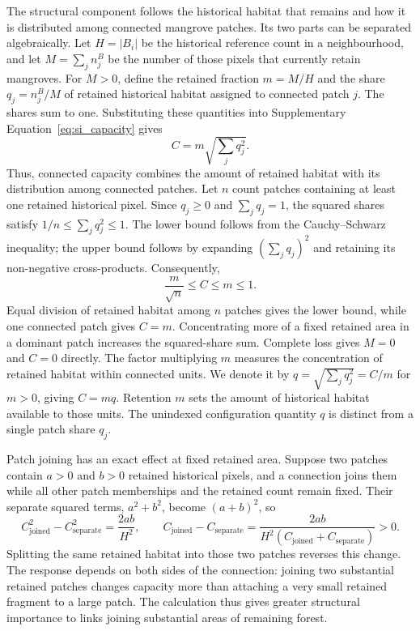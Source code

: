 The structural component follows the historical habitat that remains and how it is distributed among connected mangrove patches. Its two parts can be separated algebraically. Let $H=|B_i|$ be the historical reference count in a neighbourhood, and let $M=\sum_j n_j^B$ be the number of those pixels that currently retain mangroves. For $M>0$, define the retained fraction $m=M/H$ and the share $q_j=n_j^B/M$ of retained historical habitat assigned to connected patch $j$. The shares sum to one. Substituting these quantities into Supplementary Equation~\eqref{eq:si_capacity} gives
\begin{equation}\label{eq:si_capacity_factor}
C=m\sqrt{\sum_j q_j^2}.
\end{equation}
Thus, connected capacity combines the amount of retained habitat with its distribution among connected patches. Let $n$ count patches containing at least one retained historical pixel. Since $q_j\geq0$ and $\sum_jq_j=1$, the squared shares satisfy $1/n\leq\sum_jq_j^2\leq1$. The lower bound follows from the Cauchy--Schwarz inequality; the upper bound follows by expanding $(\sum_jq_j)^2$ and retaining its non-negative cross-products. Consequently,
\[
\frac{m}{\sqrt n}\leq C\leq m\leq1.
\]
Equal division of retained habitat among $n$ patches gives the lower bound, while one connected patch gives $C=m$. Concentrating more of a fixed retained area in a dominant patch increases the squared-share sum. Complete loss gives $M=0$ and $C=0$ directly. The factor multiplying $m$ measures the concentration of retained habitat within connected units. We denote it by $q=\sqrt{\sum_jq_j^2}=C/m$ for $m>0$, giving $C=mq$. Retention $m$ sets the amount of historical habitat available to those units. The unindexed configuration quantity $q$ is distinct from a single patch share $q_j$.

Patch joining has an exact effect at fixed retained area. Suppose two patches contain $a>0$ and $b>0$ retained historical pixels, and a connection joins them while all other patch memberships and the retained count remain fixed. Their separate squared terms, $a^2+b^2$, become $(a+b)^2$, so
\[
C_{\mathrm{joined}}^2-C_{\mathrm{separate}}^2=\frac{2ab}{H^2},\qquad
C_{\mathrm{joined}}-C_{\mathrm{separate}}
=\frac{2ab}{H^2(C_{\mathrm{joined}}+C_{\mathrm{separate}})}>0.
\]
Splitting the same retained habitat into those two patches reverses this change. The response depends on both sides of the connection: joining two substantial retained patches changes capacity more than attaching a very small retained fragment to a large patch. The calculation thus gives greater structural importance to links joining substantial areas of remaining forest.

